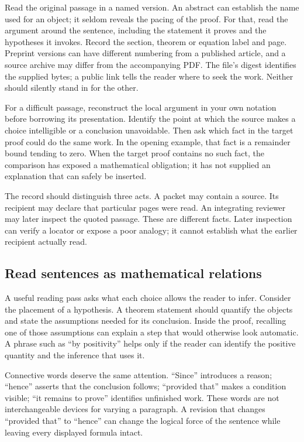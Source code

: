 Read the original passage in a named version. An abstract can establish the
name used for an object; it seldom reveals the pacing of the proof. For that,
read the argument around the sentence, including the statement it proves and
the hypotheses it invokes. Record the section, theorem or equation label and
page. Preprint versions can have different numbering from a published article,
and a source archive may differ from the accompanying PDF. The file's digest
identifies the supplied bytes; a public link tells the reader where to seek
the work. Neither should silently stand in for the other.

For a difficult passage, reconstruct the local argument in your own notation
before borrowing its presentation. Identify the point at which the source
makes a choice intelligible or a conclusion unavoidable. Then ask which fact
in the target proof could do the same work. In the opening example, that fact
is a remainder bound tending to zero. When the target proof contains no such
fact, the comparison has exposed a mathematical obligation; it has not supplied
an explanation that can safely be inserted.

The record should distinguish three acts. A packet may contain a source. Its
recipient may declare that particular pages were read. An integrating reviewer
may later inspect the quoted passage. These are different facts. Later
inspection can verify a locator or expose a poor analogy; it cannot establish
what the earlier recipient actually read.

\subsection{Read sentences as mathematical relations}

A useful reading pass asks what each choice allows the reader to infer.
Consider the placement of a hypothesis. A theorem statement should quantify
the objects and state the assumptions needed for its conclusion. Inside the
proof, recalling one of those assumptions can explain a step that would
otherwise look automatic. A phrase such as ``by positivity'' helps only if
the reader can identify the positive quantity and the inference that uses it.

Connective words deserve the same attention. ``Since'' introduces a reason;
``hence'' asserts that the conclusion follows; ``provided that'' makes a
condition visible; ``it remains to prove'' identifies unfinished work. These
words are not interchangeable devices for varying a paragraph. A revision
that changes ``provided that'' to ``hence'' can change the logical force of
the sentence while leaving every displayed formula intact.

